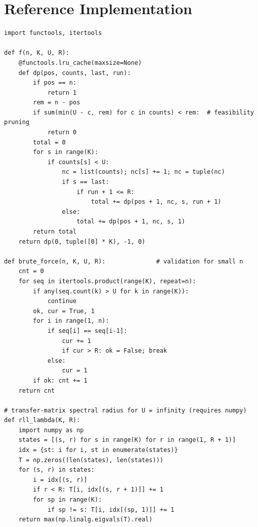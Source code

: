\documentclass[a4paper,12pt]{article}
\begin{document}
\section{Reference Implementation}
\label{app:code}

\begin{verbatim}
import functools, itertools

def f(n, K, U, R):
    @functools.lru_cache(maxsize=None)
    def dp(pos, counts, last, run):
        if pos == n:
            return 1
        rem = n - pos
        if sum(min(U - c, rem) for c in counts) < rem:  # feasibility pruning
            return 0
        total = 0
        for s in range(K):
            if counts[s] < U:
                nc = list(counts); nc[s] += 1; nc = tuple(nc)
                if s == last:
                    if run + 1 <= R:
                        total += dp(pos + 1, nc, s, run + 1)
                else:
                    total += dp(pos + 1, nc, s, 1)
        return total
    return dp(0, tuple([0] * K), -1, 0)

def brute_force(n, K, U, R):              # validation for small n
    cnt = 0
    for seq in itertools.product(range(K), repeat=n):
        if any(seq.count(k) > U for k in range(K)):
            continue
        ok, cur = True, 1
        for i in range(1, n):
            if seq[i] == seq[i-1]:
                cur += 1
                if cur > R: ok = False; break
            else:
                cur = 1
        if ok: cnt += 1
    return cnt

# transfer-matrix spectral radius for U = infinity (requires numpy)
def rll_lambda(K, R):
    import numpy as np
    states = [(s, r) for s in range(K) for r in range(1, R + 1)]
    idx = {st: i for i, st in enumerate(states)}
    T = np.zeros((len(states), len(states)))
    for (s, r) in states:
        i = idx[(s, r)]
        if r < R: T[i, idx[(s, r + 1)]] += 1
        for sp in range(K):
            if sp != s: T[i, idx[(sp, 1)]] += 1
    return max(np.linalg.eigvals(T).real)
\end{verbatim}
\end{document}
